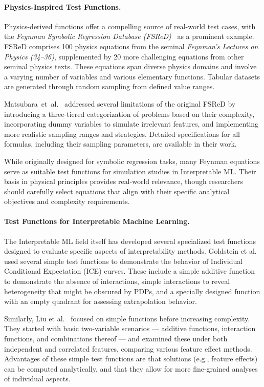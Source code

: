 \documentclass[runningheads]{llncs}
\begin{document}
\paragraph{Physics-Inspired Test Functions.}

Physics-derived functions offer a compelling source of real-world test cases,
with the \textit{Feynman Symbolic Regression Database
    (FSReD)}~\cite{udrescu_ai_2020} as a prominent example. FSReD comprises 100
physics equations from the seminal \textit{Feynman's Lectures on Physics
    (34--36)}, supplemented by 20 more challenging equations from other seminal
physics texts. These equations span diverse physics domains and involve a
varying number of variables and various elementary functions. Tabular datasets are
generated through random sampling from defined value ranges.

Matsubara~et~al.~\cite{matsubara_rethinking_2024} addressed several limitations
of the original FSReD by introducing a three-tiered categorization of problems
based on their complexity, incorporating dummy variables to
simulate irrelevant features, and implementing more realistic sampling ranges and
strategies. Detailed specifications for all formulas, including their sampling
parameters, are available in their work.

While originally designed for symbolic regression tasks, many Feynman equations
serve as suitable test functions for simulation studies in Interpretable
ML. Their basis in physical principles provides real-world relevance, though  %
researchers should carefully select equations that align with their specific
analytical objectives and complexity requirements.

\paragraph{Test Functions for Interpretable Machine Learning.}
The Interpretable ML field itself has developed several specialized test
functions designed to evaluate specific aspects of interpretability methods.
Goldstein et al.~\cite{goldstein_peeking_2015} used several simple test
functions to demonstrate the behavior of Individual Conditional Expectation
(ICE) curves. These include a simple additive function to demonstrate the
absence of interactions, simple interactions to reveal heterogeneity that might
be obscured by PDPs, and a specially designed
function with an empty quadrant for assessing extrapolation behavior.

Similarly, Liu et al.~\cite{liu_model_2018} focused on simple functions before
increasing complexity. They started with basic two-variable scenarios
--- additive functions, interaction functions, and combinations thereof
--- and examined these under both independent and correlated features,
comparing various feature effect methods. Advantages of these simple test
functions are that solutions (e.g., feature effects) can be computed
analytically, and that they allow for more fine-grained analyses of
individual aspects.
\end{document}
